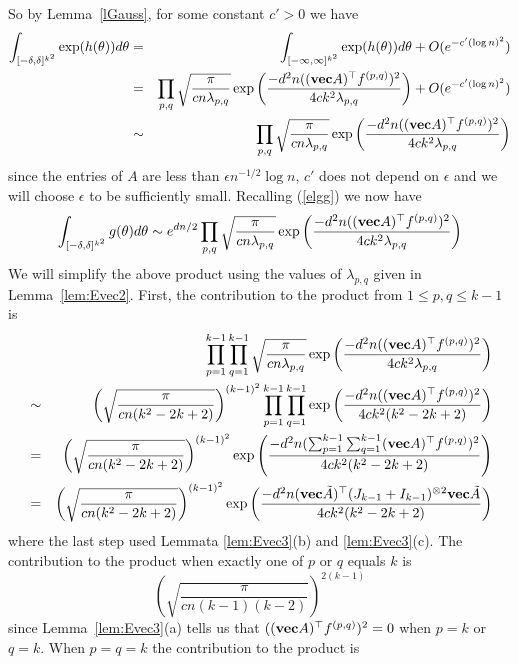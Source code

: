 \documentclass[12pt]{article}
\newcommand{\lab}[1]{\label{#1}}
\newcounter{step}
\def\be{\begin{equation}}
\def\ee{\end{equation}}
\newcommand{\eqn}[1]{(\ref{#1})}
\newcommand{\bel}[1]{\be\lab{#1}}
\def\transpose{\top}
\def\mvec{{\bf vec}}
\def\vtheta{{\bf \theta}}
\begin{document}
So by Lemma~\ref{lGauss}, for some constant $c'>0$ we have
\begin{eqnarray*}
\int_{[-\delta,\delta]^{k^2}} 
\exp(h(\vtheta))d\vtheta
&=&
\int_{[-\infty,\infty]^{k^2}} 
\exp(h(\vtheta))d\vtheta
+O(e^{-c'(\log n)^2})\\
&=&
\prod_{p,q}
\sqrt{\frac{\pi}{cn\lambda_{p,q}}}
\exp\left( \frac{-d^2n((\mvec A)^\transpose f^{(p,q)})^2 }
{4ck^2\lambda_{p,q}}  \right)
+O(e^{-c'(\log n)^2})\\
&\sim&
\prod_{p,q}
\sqrt{\frac{\pi}{cn\lambda_{p,q}}}
\exp\left( \frac{-d^2n((\mvec A)^\transpose f^{(p,q)})^2 }
{4ck^2\lambda_{p,q}}  \right)
\end{eqnarray*}
since the entries of $A$ are less than $\epsilon n^{-1/2}\log n$, $c'$ does not depend on $\epsilon$ and we will
choose $\epsilon$ to be sufficiently small.
 Recalling \eqn{elgg} we now have
\bel{eIntProd}
\int_{[-\delta,\delta]^{k^2}} g(\vtheta) d\vtheta
\sim
e^{dn/2}
\prod_{p,q}
\sqrt{\frac{\pi}{cn\lambda_{p,q}}}
\exp\left( \frac{-d^2n((\mvec A)^\transpose f^{(p,q)})^2 }
{4ck^2\lambda_{p,q}}  \right)
\ee
We will simplify the above product using the values of $\lambda_{p,q}$ given in Lemma~\ref{lem:Evec2}.
First, the contribution to  the product from  $1\le p,q \le k-1$ is
\begin{eqnarray*}
&&\prod_{p=1}^{k-1}\prod_{q=1}^{k-1}
\sqrt{\frac{\pi}{cn\lambda_{p,q}}}
\exp\left( \frac{-d^2n((\mvec A)^\transpose f^{(p,q)})^2 }
{4ck^2\lambda_{p,q}}  \right)\\
&\sim&
\left(\sqrt{\frac{\pi}{cn(k^2-2k+2)}}\right)^{(k-1)^2}
\prod_{p=1}^{k-1}\prod_{q=1}^{k-1}
\exp\left( \frac{-d^2n((\mvec A)^\transpose f^{(p,q)})^2 }
{4ck^2(k^2-2k+2)}  \right)\\
&=&
\left(\sqrt{\frac{\pi}{cn(k^2-2k+2)}}\right)^{(k-1)^2}
\exp\left( \frac{-d^2n( \sum_{p=1}^{k-1}\sum_{q=1}^{k-1}
(\mvec A)^\transpose f^{(p,q)})^2 }
{4ck^2(k^2-2k+2)}  \right)\\
&=&
\left(\sqrt{\frac{\pi}{cn(k^2-2k+2)}}\right)^{(k-1)^2}
\exp\left( \frac{-d^2n 
(\mvec \tilde A)^\transpose (J_{k-1}+I_{k-1})^{\otimes 2} \mvec \tilde A
}
{4ck^2(k^2-2k+2)}  \right)\\
\end{eqnarray*}
where the last step used Lemmata \ref{lem:Evec3}(b) and \ref{lem:Evec3}(c). 
The contribution to the product when exactly one of $p$ or $q$ equals $k$
is
\[
\left(\sqrt{\frac{\pi}{cn(k-1)(k-2)}}\right)^{2(k-1)}
\]
since Lemma~\ref{lem:Evec3}(a) tells us that $((\mvec A)^\transpose f^{(p,q)})^2=0$ when $p=k$ or $q=k$. When $p=q=k$ the contribution to the product is
\end{document}
